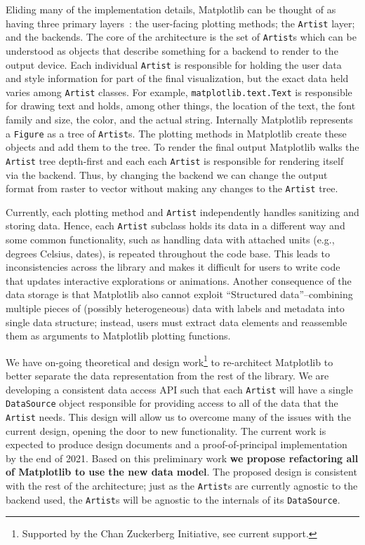 \documentclass[12pt]{article}
\numberwithin{page}{section}
\begin{document}
Eliding many of the implementation details, Matplotlib can be thought
of as having three primary layers~\cite{AOSA_mpl}: the user-facing plotting
methods; the \texttt{Artist} layer; and the backends.  The core of the
architecture is the set of \texttt{Artist}s which can be understood as
objects that describe something for a backend to render to the output device.
Each individual
\texttt{Artist} is responsible for holding the user data and style
information for part of the final visualization, but the exact data
held varies among \texttt{Artist} classes.  For example,
\texttt{matplotlib.text.Text} is responsible for drawing text and
holds, among other things, the location of the text, the font family
and size, the color, and the actual string.  Internally Matplotlib
represents a \texttt{Figure} as a tree of \texttt{Artist}s.  The
plotting methods in Matplotlib create these objects and add them to
the tree.  To render the final output Matplotlib walks the
\texttt{Artist} tree depth-first and each each \texttt{Artist} is
responsible for rendering itself via the backend.  Thus, by changing
the backend we can change the output format from raster to vector
without making any changes to the \texttt{Artist} tree.


Currently, each plotting method and \texttt{Artist} independently
handles sanitizing and storing data.  Hence, each \texttt{Artist}
subclass holds its data in a different way and some common
functionality, such as handling data with attached units (e.g.,
degrees Celsius, dates), is repeated throughout the code base.  This
leads to inconsistencies across the library and makes it difficult for
users to write code that updates interactive explorations or
animations.  Another consequence of the data storage is that
Matplotlib also cannot exploit ``Structured data''--combining multiple
pieces of (possibly heterogeneous) data with labels and metadata into
single data structure; instead, users must extract data elements and
reassemble them as arguments to Matplotlib plotting functions.

We have on-going theoretical and design work\footnote{Supported by the
Chan Zuckerberg Initiative, see current support.} to re-architect
Matplotlib to better separate the data representation from the rest of
the library.  We are developing a consistent data access API such that
each \texttt{Artist} will have a single \texttt{DataSource} object
responsible for providing access to all of the data that the
\texttt{Artist} needs.  This design will allow us to overcome many of
the issues with the current design, opening the door to
new functionality.  The current work is expected to produce design
documents and a proof-of-principal implementation by the end of 2021.
Based on this preliminary work \textbf{we propose refactoring all of
  Matplotlib to use the new data model}.  The proposed design is
consistent with the rest of the architecture; just as the
\texttt{Artist}s are currently agnostic to the backend used, the
\texttt{Artist}s will be agnostic to the internals of its \texttt{DataSource}.
\end{document}
